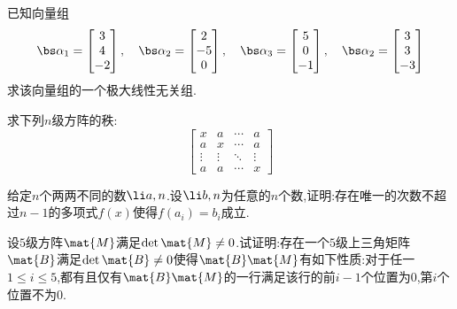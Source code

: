 \documentclass{ctexart}
\begin{document}
\begin{homework}[5(10')]
    已知向量组
    \[\bs\alpha_1=\begin{bmatrix}
        3\\4\\-2
    \end{bmatrix},\quad\bs\alpha_2=\begin{bmatrix}
        2\\-5\\0
    \end{bmatrix},\quad\bs\alpha_3=\begin{bmatrix}
        5\\0\\-1
    \end{bmatrix},\quad\bs\alpha_2=\begin{bmatrix}
        3\\3\\-3
    \end{bmatrix}\]
    求该向量组的一个极大线性无关组.
\end{homework}
\begin{homework}[6(12')]
    求下列$n$级方阵的秩:
    \[\begin{bmatrix}
        x&a&\cdots&a\\
        a&x&\cdots&a\\
        \vdots&\vdots&\ddots&\vdots\\
        a&a&\cdots&x
    \end{bmatrix}\]
\end{homework}
\begin{homework}[7(10')]
    给定$n$个两两不同的数$\li a,n$.设$\li b,n$为任意的$n$个数,证明:存在唯一的次数不超过$n-1$的多项式$f(x)$使得$f\left(a_i\right)=b_i$成立.
\end{homework}
\begin{homework}[8(10')]
    设$5$级方阵$\mat{M}$满足$\det\mat{M}\neq0$.试证明:存在一个$5$级上三角矩阵$\mat{B}$满足$\det\mat{B}\neq0$使得$\mat{B}\mat{M}$有如下性质:对于任一$1\leqslant i\leqslant 5$,都有且仅有$\mat{B}\mat{M}$的一行满足该行的前$i-1$个位置为$0$,第$i$个位置不为$0$.
\end{homework}
\end{document}
